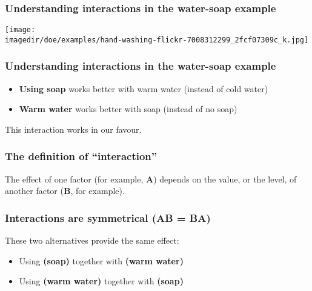 {
\begin{frame}\frametitle{}
\end{frame}}

\begin{frame}\frametitle{Understanding interactions in the water-soap example}
	\begin{center}
		\texttt{[image: \\imagedir/doe/examples/hand-washing-flickr-7008312299\_2fcf07309c\_k.jpg]}
	\end{center}
	\vspace{-4cm}
\end{frame}

\begin{frame}\frametitle{Understanding interactions in the water-soap example}
	\begin{itemize}
		\item	\textbf{Using soap} works better with warm water (instead of cold water)

		
		\vspace{24pt}
		\pause
		\item	\textbf{Warm water} works better with soap (instead of no soap)
			
	\end{itemize}
	\pause
	\vspace{24pt}
	This interaction works in our favour.
\end{frame}

\begin{frame}\frametitle{The definition of ``interaction''}
	\begin{exampleblock}{}
		The effect of one factor (for example, \textbf{A}) depends on the value, or the level, of another factor (\textbf{B}, for example).
	\end{exampleblock}
\end{frame}

\begin{frame}\frametitle{Interactions are symmetrical (\textbf{AB} = \textbf{BA})}
	These two alternatives provide the same effect: \vspace{24pt}
	\begin{itemize}
		\item	Using \textbf{(soap)} together with \textbf{(warm water)} 
		\vspace{12pt}
		\item	Using \textbf{(warm water)} together with \textbf{(soap)}  
	\end{itemize}
\end{frame}

